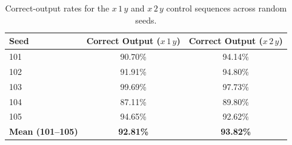 \begin{table}[htbp]
    \centering
    \caption{Correct-output rates for the \(x\,1\,y\) and \(x\,2\,y\) control sequences across random seeds.}
    \label{tab:x1y-x2y-validation}
    \small
    \begin{tabular*}{0.75\linewidth}{@{\extracolsep{\fill}}lcc@{}}
        \toprule
        \textbf{Seed} & \textbf{Correct Output (\(x\,1\,y\))} & \textbf{Correct Output (\(x\,2\,y\))} \\
        \midrule
        101 & 90.70\% & 94.14\% \\
        102 & 91.91\% & 94.80\% \\
        103 & 99.69\% & 97.73\% \\
        104 & 87.11\% & 89.80\% \\
        105 & 94.65\% & 92.62\% \\
        \midrule
        \textbf{Mean (101--105)} & \textbf{92.81\%} & \textbf{93.82\%} \\
        \bottomrule
    \end{tabular*}
\end{table}
